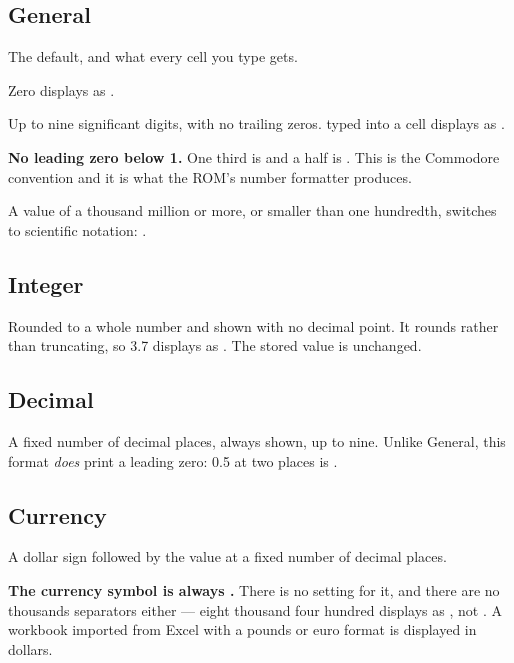 \subsection{General}

The default, and what every cell you type gets.

\begin{ccsteps}
\item Zero displays as .
\item Up to nine significant digits, with no trailing zeros.  typed
into a cell displays as .
\item \textbf{No leading zero below 1.} One third is  and a
half is . This is the Commodore convention and it is what the ROM's
number formatter produces.
\item A value of a thousand million or more, or smaller than one hundredth,
switches to scientific notation: .
\end{ccsteps}

\subsection{Integer}

Rounded to a whole number and shown with no decimal point. It rounds rather
than truncating, so 3.7 displays as . The stored value is unchanged.

\subsection{Decimal}

A fixed number of decimal places, always shown, up to nine. Unlike General,
this format \emph{does} print a leading zero: 0.5 at two places is .

\subsection{Currency}

A dollar sign followed by the value at a fixed number of decimal places.

\begin{ccnote}
\textbf{The currency symbol is always \lit{\$}.} There is no setting for it,
and there are no thousands separators either --- eight thousand four hundred
displays as , not . A workbook imported from
Excel with a pounds or euro format is displayed in dollars.
\end{ccnote}

